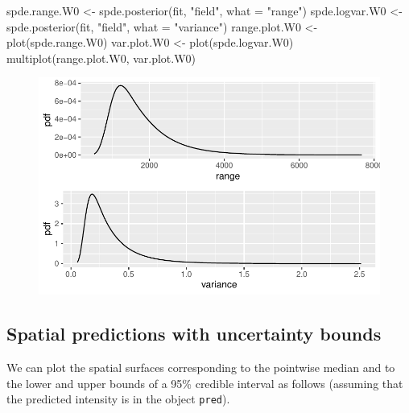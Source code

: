 \documentclass[
  a4paper,
]{article}
\newenvironment{Shaded}{\begin{snugshade}}{\end{snugshade}}
\newcommand{\AttributeTok}[1]{\textcolor[rgb]{0.40,0.45,0.13}{#1}}
\newcommand{\FunctionTok}[1]{\textcolor[rgb]{0.28,0.35,0.67}{#1}}
\newcommand{\NormalTok}[1]{\textcolor[rgb]{0.00,0.23,0.31}{#1}}
\newcommand{\OtherTok}[1]{\textcolor[rgb]{0.00,0.23,0.31}{#1}}
\newcommand{\StringTok}[1]{\textcolor[rgb]{0.13,0.47,0.30}{#1}}
\begin{document}
\begin{Shaded}
\begin{Highlighting}[]
\NormalTok{spde.range.W0 }\OtherTok{\textless{}{-}} \FunctionTok{spde.posterior}\NormalTok{(fit, }\StringTok{"field"}\NormalTok{, }\AttributeTok{what =} \StringTok{"range"}\NormalTok{)}
\NormalTok{spde.logvar.W0 }\OtherTok{\textless{}{-}} \FunctionTok{spde.posterior}\NormalTok{(fit, }\StringTok{"field"}\NormalTok{, }\AttributeTok{what =} \StringTok{"variance"}\NormalTok{)}
\NormalTok{range.plot.W0 }\OtherTok{\textless{}{-}} \FunctionTok{plot}\NormalTok{(spde.range.W0)}
\NormalTok{var.plot.W0 }\OtherTok{\textless{}{-}} \FunctionTok{plot}\NormalTok{(spde.logvar.W0)}
\FunctionTok{multiplot}\NormalTok{(range.plot.W0, var.plot.W0)}
\end{Highlighting}
\end{Shaded}

\begin{figure}[H]

{\centering \includegraphics{pedometron_files/figure-pdf/unnamed-chunk-12-1.pdf}

}

\end{figure}

\hypertarget{spatial-predictions-with-uncertainty-bounds}{%
\subsection{Spatial predictions with uncertainty
bounds}\label{spatial-predictions-with-uncertainty-bounds}}

We can plot the spatial surfaces corresponding to the pointwise median
and to the lower and upper bounds of a 95\% credible interval as follows
(assuming that the predicted intensity is in the object \texttt{pred}).
\end{document}

